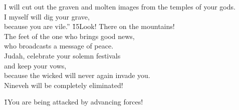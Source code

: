 \begin{poetry}
\poeml I will cut out the graven and molten images from the temples of your gods. \\
\poemll    I myself will dig your grave, \\
\poemlll       because you are vile.''
\poeml \v{15}Look! There on the mountains! \\
\poemll    The feet of the one who brings good news, \\
\poemlll       who broadcasts a message of peace. \\
\poeml Judah, celebrate your solemn festivals \\
\poemll    and keep your vows, \\
\poeml because the wicked will never again invade you. \\
\poemll    Nineveh will be completely eliminated!
\end{poetry}

\v{1}You are being attacked by advancing forces!

